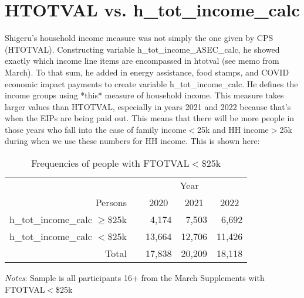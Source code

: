 \documentclass{article}
\newcommand{\mct}[1]{\multicolumn{1}{c}{#1}}
\newcommand{\mc}[3]{\multicolumn{#1}{#2}{#3}}
\begin{document}
	\section{HTOTVAL vs. h\_tot\_income\_calc} Shigeru's household income measure was not simply the one given by CPS (HTOTVAL). Constructing variable h\_tot\_income\_ASEC\_calc, he showed exactly which income line items are encompassed in htotval (see memo from March). To that sum, he added in energy assistance, food stamps, and COVID economic impact payments to create variable h\_tot\_income\_calc. He defines the income groups using *this* measure of household income. This measure takes larger values than HTOTVAL, especially in years 2021 and 2022 because that's when the EIPs are being paid out. This means that there will be more people in those years who fall into the case of family income$<$25k and HH income$>$25k during when we use these numbers for HH income. This is shown here:
	\begin{table}[H]
		\centering
		\caption{Frequencies of people with FTOTVAL$<$\$25k}
		\begin{tabularx}{0.8\textwidth}{@{\extracolsep{\fill}}r r r r r }
			\toprule 
			& \mc{4}{c}{Year}  \\ \cmidrule(lr){2-5}
			Persons 	& 		&	\mct{2020}	&	\mct{2021}	&	\mct{2022}	\\ \midrule
			h\_tot\_income\_calc $\ge$\$25k \hspace{0.1cm}  	&	&	4,174	&	7,503	&	6,692	\\
			h\_tot\_income\_calc $<$\$25k \hspace{0.1cm} 		&	&	13,664	&	12,706	&	11,426	\\
			\midrule
			Total \hspace{0.1cm} 		&	&	17,838	&	20,209	&	18,118	\\
			\bottomrule
		\end{tabularx}
		\vspace{1mm}
		\vspace{1mm}
		\begin{minipage}[t]{\textwidth}
			\footnotesize{\emph{Notes}: Sample is all participants 16+ from the March Supplements with FTOTVAL$<$\$25k}
		\end{minipage}
	\end{table} 
	
\end{document}
